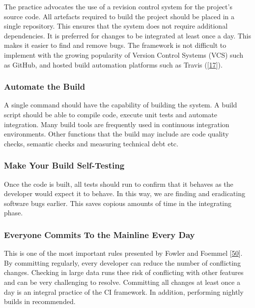 \documentclass[]{book}
\begin{document}
The practice advocates the use of a revision control system for the
project's source code. All artefacts required to build the project
should be placed in a single repository. This ensures that the system
does not require additional dependencies. It is preferred for changes to
be integrated at least once a day. This makes it easier to find and
remove bugs. The framework is not difficult to implement with the
growing popularity of Version Control Systems (VCS) such as GitHub, and
hosted build automation platforms such as Travis
({[}\protect\hyperlink{ref-beller2017travistorrent}{17}{]}).

\subsubsection{Automate the Build}\label{automate-the-build}

A single command should have the capability of building the system. A
build script should be able to compile code, execute unit tests and
automate integration. Many build tools are frequently used in continuous
integration environments. Other functions that the build may include are
code quality checks, semantic checks and measuring technical debt etc.

\subsubsection{Make Your Build
Self-Testing}\label{make-your-build-self-testing}

Once the code is built, all tests should run to confirm that it behaves
as the developer would expect it to behave. In this way, we are finding
and eradicating software bugs earlier. This saves copious amounts of
time in the integrating phase.

\subsubsection{Everyone Commits To the Mainline Every
Day}\label{everyone-commits-to-the-mainline-every-day}

This is one of the most important rules presented by Fowler and Foemmel
{[}\protect\hyperlink{ref-fowler2006continuous}{50}{]}. By committing
regularly, every developer can reduce the number of conflicting changes.
Checking in large data runs thee risk of conflicting with other features
and can be very challenging to resolve. Committing all changes at least
once a day is an integral practice of the CI framework. In addition,
performing nightly builds in recommended.
\end{document}
